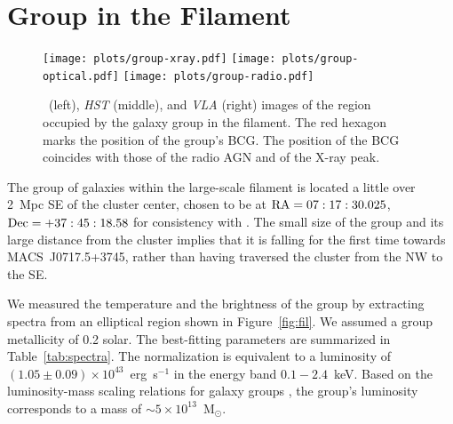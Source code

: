 \section{Group in the Filament}
\label{sec:Group}

\begin{figure*}
	\texttt{[image: plots/group-xray.pdf]}
	\texttt{[image: plots/group-optical.pdf]}
	\texttt{[image: plots/group-radio.pdf]}
	\caption{\chandra\ (left), \emph{HST} (middle), and \emph{VLA} (right) images of the region occupied by the galaxy group in the filament. The red hexagon marks the position of the group's BCG. The position of the BCG coincides with those of the radio AGN and of the X-ray peak.\label{fig:group}}
\end{figure*}

The group of galaxies within the large-scale filament is located a little over 2~Mpc SE of the cluster center, chosen to be at ${\rm RA} = 07:17:30.025$, ${\rm Dec} = +37:45:18.58$ for consistency with \citet{Jauzac2012}. The small size of the group and its large distance from the cluster implies that it is falling for the first time towards MACS~J0717.5+3745, rather than having traversed the cluster from the NW to the SE.

We measured the temperature and the brightness of the group by extracting spectra from an elliptical region shown in Figure~\ref{fig:fil}. We assumed a group metallicity of 0.2 solar. The best-fitting parameters are summarized in Table~\ref{tab:spectra}. The normalization is equivalent to a luminosity of $(1.05\pm 0.09) \times 10^{43}$~erg~s$^{-1}$ in the energy band $0.1-2.4$~keV. Based on the luminosity-mass scaling relations for galaxy groups \citep[e.g.,][]{Connor2014}, the group's luminosity corresponds to a mass of $\sim 5\times 10^{13}$~M$_\odot$.

